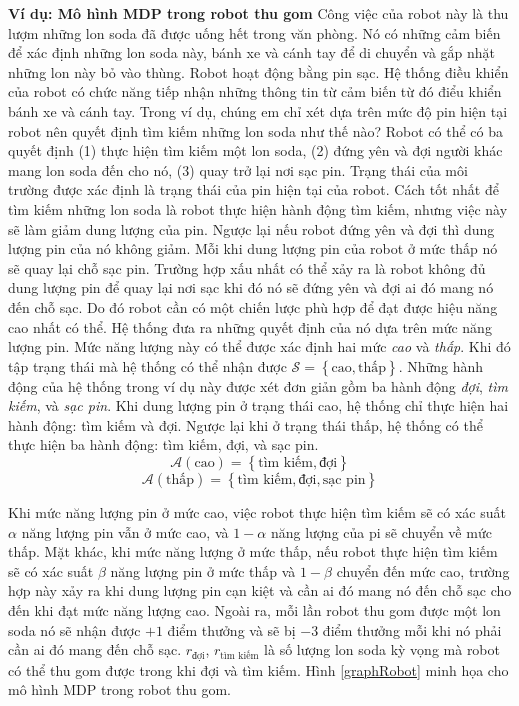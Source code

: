 \textbf{Ví dụ: Mô hình MDP trong robot thu gom} Công việc của robot này là thu lượm những lon soda đã được uống hết trong văn phòng. Nó có những cảm biến để xác định những lon soda này, bánh xe và cánh tay để di chuyển và gắp nhặt những lon này bỏ vào thùng. Robot hoạt động bằng pin sạc. Hệ thống điều khiển của robot có chức năng tiếp nhận những thông tin từ cảm biến từ đó điểu khiển bánh xe và cánh tay. Trong ví dụ, chúng em chỉ xét dựa trên mức độ pin hiện tại robot nên quyết định tìm kiếm những lon soda như thế nào? Robot có thể có ba quyết định (1) thực hiện tìm kiếm một lon soda, (2) đứng yên và đợi người khác mang lon soda đến cho nó, (3) quay trở lại nơi sạc pin. Trạng thái của môi trường được xác định là trạng thái của pin hiện tại của robot. Cách tốt nhất để tìm kiếm những lon soda là robot thực hiện hành động tìm kiếm, nhưng việc này sẽ làm giảm dung lượng của pin. Ngược lại nếu robot đứng yên và đợi thì dung lượng pin của nó không giảm. Mỗi khi dung lượng pin của robot ở mức thấp nó sẽ quay lại chỗ sạc pin. Trường hợp xấu nhất có thể xảy ra là robot không đủ dung lượng pin để quay lại nơi sạc khi đó nó sẽ đứng yên và đợi ai đó mang nó đến chỗ sạc. Do đó robot cần có một chiến lược phù hợp để đạt được hiệu năng cao nhất có thể.
Hệ thống đưa ra những quyết định của nó dựa trên mức năng lượng pin. Mức năng lượng này có thể được xác định hai mức \textit{cao} và \textit{thấp}. Khi đó tập trạng thái mà hệ thống có thể nhận được $\mathcal{S} = \left \{\text{cao}, \text{thấp} \right \}$. Những hành động của hệ thống trong ví dụ này được xét đơn giản gồm ba hành động \textit{đợi}, \textit{tìm kiếm}, và \textit{sạc pin}. Khi dung lượng pin ở trạng thái cao, hệ thống chỉ thực hiện hai hành động: tìm kiếm và đợi. Ngược lại khi ở trạng thái thấp, hệ thống có thể thực hiện ba hành động: tìm kiếm, đợi, và sạc pin.
$$\mathcal{A}(\text{cao}) =  \left \{\text{tìm kiếm}, \text{đợi} \right \}$$
$$\mathcal{A}(\text{thấp}) =  \left \{\text{tìm kiếm}, \text{đợi}, \text{sạc pin} \right \}$$

Khi mức năng lượng pin ở mức cao, việc robot thực hiện tìm kiếm sẽ có xác suất $\alpha$ năng lượng pin vẫn ở mức cao, và $1 - \alpha$ năng lượng của pi sẽ chuyển về mức thấp. Mặt khác, khi mức năng lượng ở mức thấp, nếu robot thực hiện tìm kiếm sẽ có xác suất $\beta$ năng lượng pin ở mức thấp và $1 - \beta$ chuyển đến mức cao, trường hợp này xảy ra khi dung lượng pin cạn kiệt và cần ai đó mang nó đến chỗ sạc cho đến khi đạt mức năng lượng cao. Ngoài ra, mỗi lần robot thu gom được một lon soda nó sẽ nhận được $+1$ điểm thưởng và sẽ bị $-3$ điểm thưởng mỗi khi nó phải cần ai đó mang đến chỗ sạc. $r_{\text{đợi}}$, $r_{\text{tìm kiếm}}$ là số lượng lon soda kỳ vọng mà robot có thể thu gom được trong khi đợi và tìm kiếm. Hình \ref{graphRobot} minh họa cho mô hình MDP trong robot thu gom.

